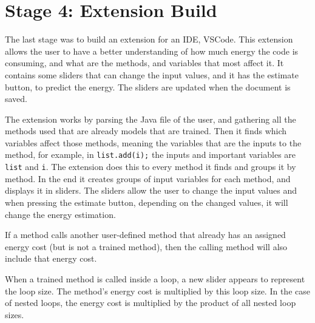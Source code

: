 \section{Stage 4: Extension Build} \label{sec:work_stage4_extension_build}

The last stage was to build an extension for an IDE, VSCode. This extension allows the user to have a better understanding of how much energy the code is consuming, and what are the methods, and variables that most affect it.
It contains some sliders that can change the input values, and it has the estimate button, to predict the energy.
The sliders are updated when the document is saved.%

The extension works by parsing the Java file of the user, and gathering all the methods used that are already models that are trained. Then it finds which variables affect those methods, meaning the variables that are the inputs to the method, for example, in \texttt{list.add(i);}  the inputs and important variables are \texttt{list} and \texttt{i}.
The extension does this to every method it finds and groups it by method. In the end it creates groups of input variables for each method, and displays it in sliders. The sliders allow the user to change the input values and when pressing the estimate button, depending on the changed values, it will change the energy estimation.

If a method calls another user-defined method that already has an assigned energy cost (but is not a trained method), then the calling method will also include that energy cost.

When a trained method is called inside a loop, a new slider appears to represent the loop size. The method’s energy cost is multiplied by this loop size. In the case of nested loops, the energy cost is multiplied by the product of all nested loop sizes.
